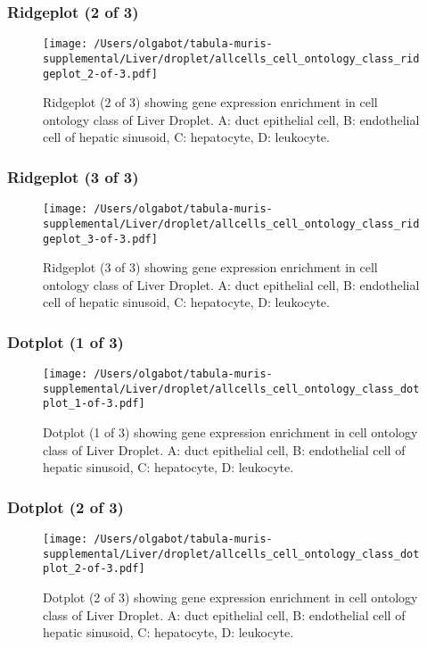\clearpage
\clearpage
\subsubsection{Ridgeplot (2 of 3)}
\begin{figure}[h]
\centering
\texttt{[image: /Users/olgabot/tabula-muris-supplemental/Liver/droplet/allcells\_cell\_ontology\_class\_ridgeplot\_2-of-3.pdf]}

\caption{ Ridgeplot (2 of 3)  showing gene expression enrichment in cell ontology class of Liver Droplet. A: duct epithelial cell, B: endothelial cell of hepatic sinusoid, C: hepatocyte, D: leukocyte.}
\end{figure}


\clearpage
\clearpage
\subsubsection{Ridgeplot (3 of 3)}
\begin{figure}[h]
\centering
\texttt{[image: /Users/olgabot/tabula-muris-supplemental/Liver/droplet/allcells\_cell\_ontology\_class\_ridgeplot\_3-of-3.pdf]}

\caption{ Ridgeplot (3 of 3)  showing gene expression enrichment in cell ontology class of Liver Droplet. A: duct epithelial cell, B: endothelial cell of hepatic sinusoid, C: hepatocyte, D: leukocyte.}
\end{figure}


\clearpage
\clearpage
\subsubsection{Dotplot (1 of 3)}
\begin{figure}[h]
\centering
\texttt{[image: /Users/olgabot/tabula-muris-supplemental/Liver/droplet/allcells\_cell\_ontology\_class\_dotplot\_1-of-3.pdf]}

\caption{ Dotplot (1 of 3)  showing gene expression enrichment in cell ontology class of Liver Droplet. A: duct epithelial cell, B: endothelial cell of hepatic sinusoid, C: hepatocyte, D: leukocyte.}
\end{figure}


\clearpage
\clearpage
\subsubsection{Dotplot (2 of 3)}
\begin{figure}[h]
\centering
\texttt{[image: /Users/olgabot/tabula-muris-supplemental/Liver/droplet/allcells\_cell\_ontology\_class\_dotplot\_2-of-3.pdf]}

\caption{ Dotplot (2 of 3)  showing gene expression enrichment in cell ontology class of Liver Droplet. A: duct epithelial cell, B: endothelial cell of hepatic sinusoid, C: hepatocyte, D: leukocyte.}
\end{figure}



